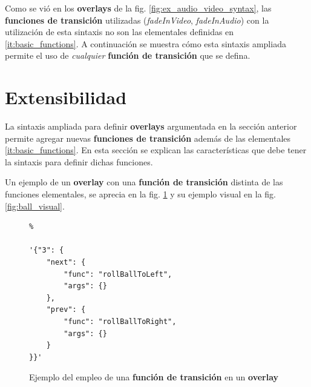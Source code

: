 		Como se vió en los \textbf{overlays} de la fig. \ref{fig:ex_audio_video_syntax}, las \textbf{funciones de transición} utilizadas (\textit{fadeInVideo}, \textit{fadeInAudio}) con la utilización de esta sintaxis no son las elementales definidas en \ref{it:basic_functions}. A continuación se muestra cómo esta sintaxis ampliada permite el uso de \textit{cualquier} \textbf{función de transición} que se defina.
	\section{Extensibilidad} %
	\label{sec:extensibilidad}
		
		La sintaxis ampliada para definir \textbf{overlays} argumentada en la sección anterior permite agregar nuevas \textbf{funciones de transición} además de las elementales \ref{it:basic_functions}. En esta sección se explican las características que debe tener la sintaxis para definir dichas funciones.

		Un ejemplo de un \textbf{overlay} con una \textbf{función de transición} distinta de las funciones elementales, se aprecia en la fig. \ref{fig:ball_code} y su ejemplo visual en la fig. \ref{fig:ball_visual}.



		\begin{figure}[htb]%
			\begin{lstlisting}%

'{"3": {
    "next": {
        "func": "rollBallToLeft",
        "args": {}
    },
    "prev": {
        "func": "rollBallToRight",
        "args": {}
    }
}}'
			\end{lstlisting}
		\caption{Ejemplo del empleo de una \textbf{función de transición} en un \textbf{overlay}} 
			\label{fig:ball_code} 
		\end{figure}	




